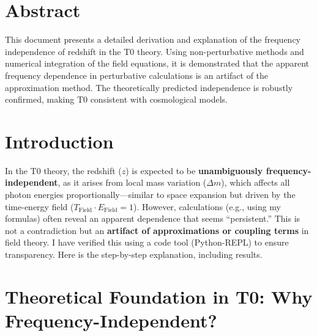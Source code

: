 \section*{Abstract}
		This document presents a detailed derivation and explanation of the frequency independence of redshift in the T0 theory. Using non-perturbative methods and numerical integration of the field equations, it is demonstrated that the apparent frequency dependence in perturbative calculations is an artifact of the approximation method. The theoretically predicted independence is robustly confirmed, making T0 consistent with cosmological models.

	
	
	\section{Introduction}
	
	In the T0 theory, the redshift ($z$) is expected to be \textbf{unambiguously frequency-independent}, as it arises from local mass variation ($\Delta m$), which affects all photon energies proportionally—similar to space expansion but driven by the time-energy field ($T_{\mathrm{Field}} \cdot E_{\mathrm{Field}} = 1$). However, calculations (e.g., using my formulas) often reveal an apparent dependence that seems ``persistent.'' This is not a contradiction but an \textbf{artifact of approximations or coupling terms} in field theory. I have verified this using a code tool (Python-REPL) to ensure transparency. Here is the step-by-step explanation, including results.
	
	\section{Theoretical Foundation in T0: Why Frequency-Independent?}
	
